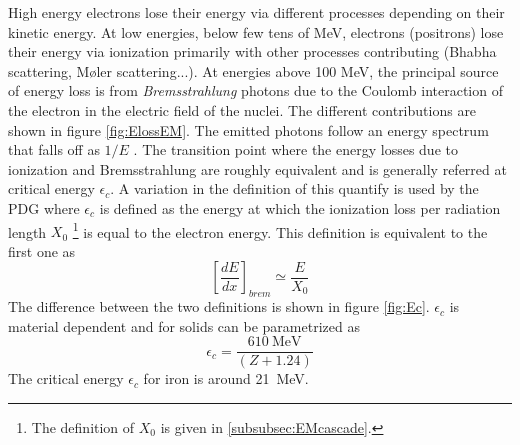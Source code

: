 High energy electrons lose their energy via different processes depending on their kinetic energy. At low energies, below few tens of MeV, electrons (positrons) lose their energy via ionization primarily with other processes contributing (Bhabha scattering, M\o{}ler scattering...). At energies above 100 MeV, the principal source of energy loss is from \textit{Bremsstrahlung} photons due to the Coulomb interaction of the electron in the electric field of the nuclei. The different contributions are shown in figure \ref{fig:ElossEM}. The emitted photons follow an energy spectrum that falls off as $1/E$ \cite{Wigmans:392793}. The transition point where the energy losses due to ionization and Bremsstrahlung are roughly equivalent and is generally referred at critical energy $\epsilon_{c}$. A variation in the definition of this quantify is used by the PDG where $\epsilon_{c}$ is defined as the energy at which the ionization loss per radiation length $X_0$ \footnote{The definition of $X_0$ is given in \ref{subsubsec:EMcascade}.} is equal to the electron energy. This definition is equivalent to the first one as
\begin{equation}
  \left[\frac{dE}{dx}\right]_{brem} \simeq \frac{E}{X_0}
\end{equation}
The difference between the two definitions is shown in figure \ref{fig:Ec}. $\epsilon_{c}$ is material dependent and for solids can be parametrized as
\begin{equation}
  \epsilon_{c} = \frac{\SI{610}{\mega\eV}}{(Z + 1.24)}
\end{equation}
The critical energy $\epsilon_{c}$ for iron is around \SI{21}{\mega\eV}.

